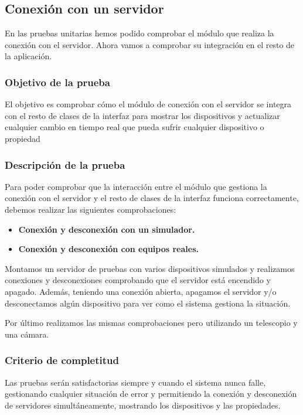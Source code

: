 \subsection{Conexión con un servidor}

En las pruebas unitarias hemos podido comprobar el módulo que realiza la conexión con el servidor. Ahora vamos a comprobar su integración en el resto de la aplicación.


\subsubsection{Objetivo de la prueba}

El objetivo es comprobar cómo el módulo de conexión con el servidor se integra con el resto de clases de la interfaz para mostrar los dispositivos y actualizar cualquier cambio en tiempo real que pueda sufrir cualquier dispositivo o propiedad

\subsubsection{Descripción de la prueba}

Para poder comprobar que la interacción entre el módulo que gestiona la conexión con el servidor y el resto de clases de la interfaz funciona correctamente, debemos realizar las siguientes comprobaciones:

\begin{itemize}
  \item \textbf{Conexión y desconexión con un simulador.}
  \item \textbf{Conexión y desconexión con equipos reales.}
\end{itemize}

Montamos un servidor de pruebas con varios dispositivos simulados y realizamos conexiones y desconexiones comprobando que el servidor está encendido y apagado. Además, teniendo una conexión abierta, apagamos el servidor y/o desconectamos algún dispositivo para ver como el sistema gestiona la situación.

\bigskip
Por último realizamos las mismas comprobaciones pero utilizando un telescopio y una cámara.

\subsubsection{Criterio de completitud}

Las pruebas serán satisfactorias siempre y cuando el sistema nunca falle, gestionando cualquier situación de error y permitiendo la conexión y desconexión de servidores simultáneamente, mostrando los dispositivos y las propiedades.


